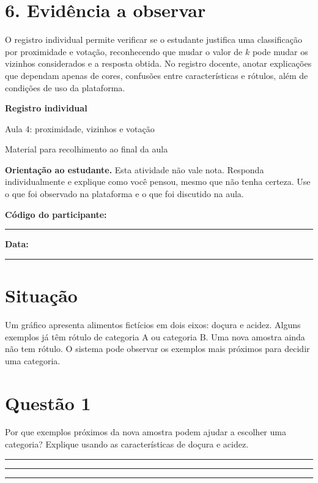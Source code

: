 \documentclass[12pt,a4paper]{article}
\newcommand{\linha}{\rule{\linewidth}{0.35pt}}
\newcommand{\bloco}[1]{%
  \vspace{0.25em}
  \noindent\colorbox{cinza}{\parbox{0.96\linewidth}{#1}}%
  \vspace{0.3em}
}
\begin{document}
\section*{6. Evidência a observar}

O registro individual permite verificar se o estudante justifica uma classificação por proximidade e votação, reconhecendo que mudar o valor de $k$ pode mudar os vizinhos considerados e a resposta obtida. No registro docente, anotar explicações que dependam apenas de cores, confusões entre características e rótulos, além de condições de uso da plataforma.

\newpage

\begin{center}
  {\LARGE\bfseries\color{azul} Registro individual}\par
  \vspace{0.2em}
  {\large Aula 4: proximidade, vizinhos e votação}\par
  \vspace{0.35em}
  {\small Material para recolhimento ao final da aula}\par
\end{center}

\bloco{\textbf{Orientação ao estudante.} Esta atividade não vale nota. Responda individualmente e explique como você pensou, mesmo que não tenha certeza. Use o que foi observado na plataforma e o que foi discutido na aula.}

\textbf{Código do participante:} \rule{5cm}{0.4pt}
\hfill
\textbf{Data:} \rule{3cm}{0.4pt}

\section*{Situação}

Um gráfico apresenta alimentos fictícios em dois eixos: doçura e acidez. Alguns exemplos já têm rótulo de categoria A ou categoria B. Uma nova amostra ainda não tem rótulo. O sistema pode observar os exemplos mais próximos para decidir uma categoria.

\section*{Questão 1}

Por que exemplos próximos da nova amostra podem ajudar a escolher uma categoria? Explique usando as características de doçura e acidez.

\vspace{0.25em}
\linha\par\vspace{0.75em}
\linha\par\vspace{0.75em}
\linha
\end{document}

